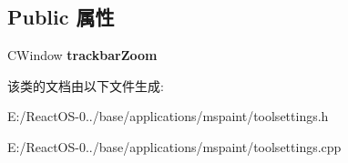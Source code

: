 \subsection*{Public 属性}
\begin{DoxyCompactItemize}
\item 
\mbox{\label{class_c_tool_settings_window_a50980c6cd884c6038723c34aab366fd9}} 
C\+Window {\bfseries trackbar\+Zoom}
\end{DoxyCompactItemize}


该类的文档由以下文件生成\+:\begin{DoxyCompactItemize}
\item 
E\+:/\+React\+O\+S-\/0../base/applications/mspaint/toolsettings.\+h\item 
E\+:/\+React\+O\+S-\/0../base/applications/mspaint/toolsettings.\+cpp\end{DoxyCompactItemize}
